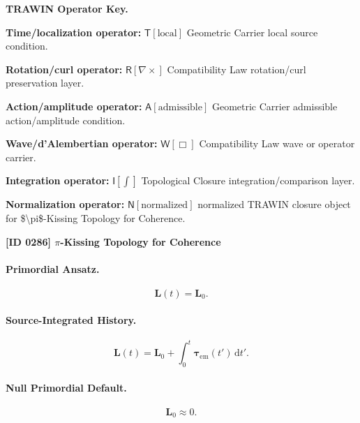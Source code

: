 \par\vspace{0.45\baselineskip}
\noindent\begin{minipage}[t]{\linewidth}
\begingroup
\small
\raggedright
\textbf{TRAWIN Operator Key.}\par
\noindent\textbf{Time/localization operator:} $\mathsf{T}\!\left[\mathrm{local}\right]$ Geometric Carrier local source condition.\par
\noindent\textbf{Rotation/curl operator:} $\mathsf{R}\!\left[\nabla\times\right]$ Compatibility Law rotation/curl preservation layer.\par
\noindent\textbf{Action/amplitude operator:} $\mathsf{A}\!\left[\mathrm{admissible}\right]$ Geometric Carrier admissible action/amplitude condition.\par
\noindent\textbf{Wave/d'Alembertian operator:} $\mathsf{W}\!\left[\Box\right]$ Compatibility Law wave or operator carrier.\par
\noindent\textbf{Integration operator:} $\mathsf{I}\!\left[\int\right]$ Topological Closure integration/comparison layer.\par
\noindent\textbf{Normalization operator:} $\mathsf{N}\!\left[\mathrm{normalized}\right]$ normalized TRAWIN closure object for \$\textbackslash{}pi\$-Kissing Topology for Coherence.\par
\endgroup
\end{minipage}

\clearpage
\noindent\textbf{[ID 0286] $\pi$-Kissing Topology for Coherence}\par
\vspace{0.35em}
\paragraph{Primordial Ansatz.}
\begin{equation}
\mathbf{L}(t)=\mathbf{L}_0 .
\end{equation}

\paragraph{Source-Integrated History.}
\begin{equation}
\mathbf{L}(t)
=
\mathbf{L}_0
+
\int_0^t
\boldsymbol{\tau}_{\mathrm{em}}(t')
\,\mathrm{d}t' .
\end{equation}

\paragraph{Null Primordial Default.}
\begin{equation}
\mathbf{L}_0\approx 0 .
\end{equation}

